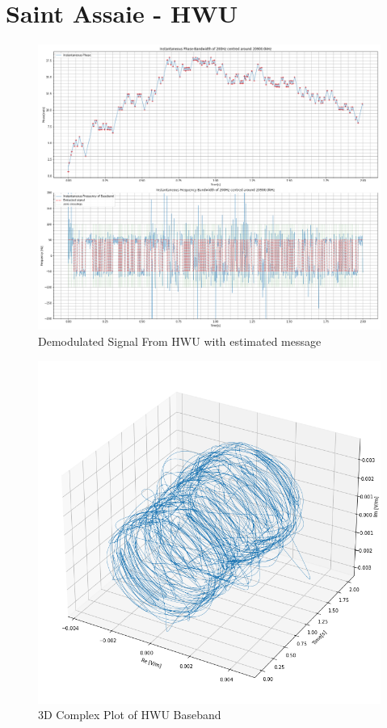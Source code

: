 \pagebreak

\section{Saint Assaie - \textbf{HWU}}
\begin{figure}[H]
    \centering
    \includegraphics[width = \textwidth]{figs/AppA/HWU.png}
    \caption{Demodulated Signal From HWU with estimated message}
    \label{fig:my_label}
\end{figure}
\begin{figure}[H]
    \centering
    \includegraphics[width = \textwidth]{figs/AppA/hwu3D.png}
    \caption{3D Complex Plot of HWU Baseband}
    \label{fig:my_label}
\end{figure}
\pagebreak
